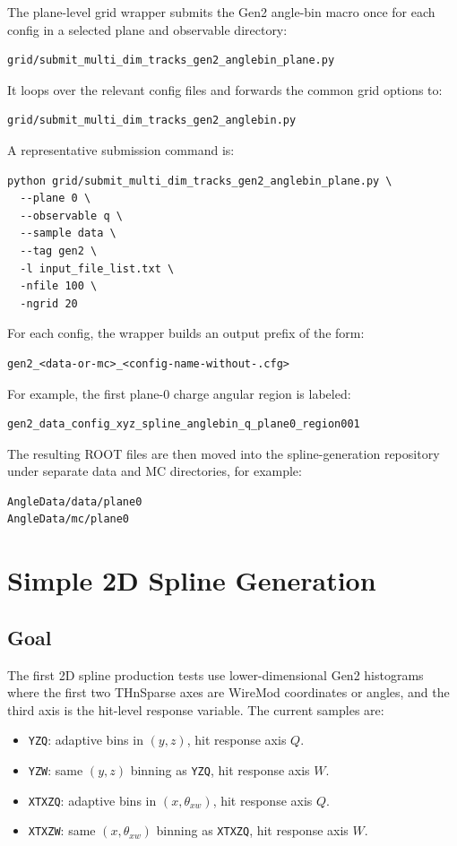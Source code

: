 \documentclass{article}
\begin{document}
The plane-level grid wrapper submits the Gen2 angle-bin macro once for each config in a selected plane and observable directory:
\begin{verbatim}
grid/submit_multi_dim_tracks_gen2_anglebin_plane.py
\end{verbatim}
It loops over the relevant config files and forwards the common grid options to:
\begin{verbatim}
grid/submit_multi_dim_tracks_gen2_anglebin.py
\end{verbatim}

A representative submission command is:
\begin{verbatim}
python grid/submit_multi_dim_tracks_gen2_anglebin_plane.py \
  --plane 0 \
  --observable q \
  --sample data \
  --tag gen2 \
  -l input_file_list.txt \
  -nfile 100 \
  -ngrid 20
\end{verbatim}
For each config, the wrapper builds an output prefix of the form:
\begin{verbatim}
gen2_<data-or-mc>_<config-name-without-.cfg>
\end{verbatim}
For example, the first plane-0 charge angular region is labeled:
\begin{verbatim}
gen2_data_config_xyz_spline_anglebin_q_plane0_region001
\end{verbatim}

The resulting ROOT files are then moved into the spline-generation repository under separate data and MC directories, for example:
\begin{verbatim}
AngleData/data/plane0
AngleData/mc/plane0
\end{verbatim}





\section{Simple 2D Spline Generation}

\subsection{Goal}

The first 2D spline production tests use lower-dimensional Gen2 histograms where the first two THnSparse axes are WireMod coordinates or angles, and the third axis is the hit-level response variable. The current samples are:
\begin{itemize}
    \item \texttt{YZQ}: adaptive bins in $(y,z)$, hit response axis $Q$.
    \item \texttt{YZW}: same $(y,z)$ binning as \texttt{YZQ}, hit response axis $W$.
    \item \texttt{XTXZQ}: adaptive bins in $(x,\theta_{xw})$, hit response axis $Q$.
    \item \texttt{XTXZW}: same $(x,\theta_{xw})$ binning as \texttt{XTXZQ}, hit response axis $W$.
\end{itemize}
\end{document}
